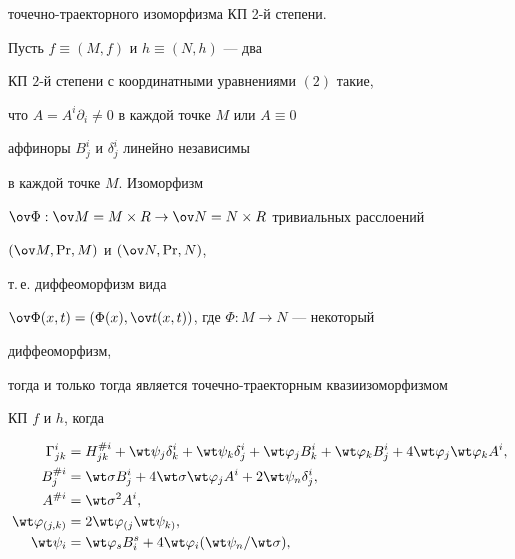 точечно-траекторного изоморфизма КП 2-й степени. 


 


\begin{thm} 


Пусть $f\equiv(M,f)$ и $h\equiv(N,h)$ --- два 


КП $2$-й степени с координатными уравнениями $(2)$ такие,


что $A=A^i\partial_i\ne0$ в каждой точке $M$ или $A\equiv0$


аффиноры $B^i_j$ и $\delta^i_j$ линейно независимы


в каждой точке $M$. Изоморфизм 


$\ov\Phi:\ov M=M\times R\to\ov N=N\times R$ тривиальных расслоений


$(\ov M,\Pr,M)$ и $(\ov N,\Pr, N)$, 


т.\,е. диффеоморфизм вида 


$\ov\Phi(x,t)=(\Phi(x),\ov t(x,t))$, где $\Phi:M\to N$ --- некоторый 


диффеоморфизм, 


тогда и только тогда является точечно-траекторным квазиизоморфизмом 


КП $f$ и $h$, когда 


\begin{align} 


\Gamma^i_{j k}&=H^{\# i}_{j k}+\wt\psi_j\delta^i_k+ 


\wt\psi_k\delta^i_j+\wt\varphi_j B^i_k+ 


\wt\varphi_k B^i_j+4\wt\varphi_j\wt\varphi_k A^i,\\ 


% 


B^{\# i}_j&=\wt\sigma B^i_j+4\wt\sigma\wt\varphi_j A^i+ 


2\wt\psi_n\delta^i_j,\\ 


% 


A^{\# i}&=\wt\sigma^2 A^i,\\ 


% 


\wt\varphi_{(j,k)}&=2\wt\varphi_{(j}\wt\psi_{k)},\\ 


% 


\wt\psi_i&=\wt\varphi_s B^s_i+4\wt\varphi_i 


(\wt \psi_n/\wt\sigma),\\ 


% 



\end{align}
\end{thm}
